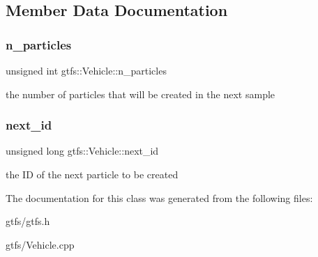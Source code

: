 \subsection{Member Data Documentation}
\mbox{\label{classgtfs_1_1Vehicle_aa21babc8423abf92bbdf5e0748444f44}} 
\subsubsection{\texorpdfstring{n\+\_\+particles}{n\_particles}}
{\footnotesize\ttfamily unsigned int gtfs\+::\+Vehicle\+::n\+\_\+particles}

the number of particles that will be created in the next sample \mbox{\label{classgtfs_1_1Vehicle_aab535dd9953f9650e2adc351965779b1}} 
\subsubsection{\texorpdfstring{next\+\_\+id}{next\_id}}
{\footnotesize\ttfamily unsigned long gtfs\+::\+Vehicle\+::next\+\_\+id}

the ID of the next particle to be created 

The documentation for this class was generated from the following files\+:\begin{DoxyCompactItemize}
\item 
gtfs/gtfs.\+h\item 
gtfs/Vehicle.\+cpp\end{DoxyCompactItemize}
